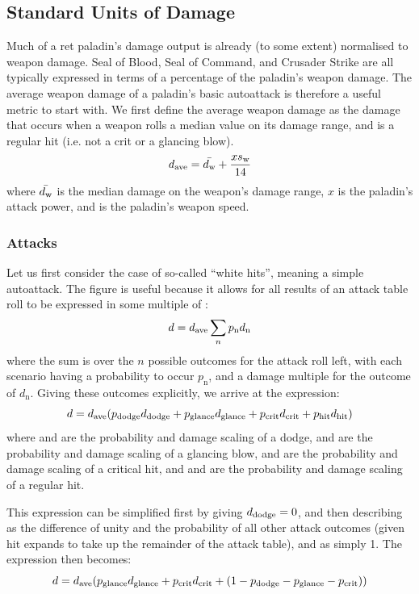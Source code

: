 \documentclass[letterpaper,11pt]{article}
\begin{document}
	\subsection{Standard Units of Damage}
	Much of a ret paladin's damage output is already (to some extent) normalised to weapon damage.	
	Seal of Blood, Seal of Command, and Crusader Strike are all typically expressed in terms of a percentage of the paladin's weapon damage.
	The average weapon damage of a paladin's basic autoattack is therefore a useful metric to start with.
	We first define the average weapon damage as the damage that occurs when a weapon rolls a median value on its damage range, and is a regular hit (i.e. not a crit or a glancing blow).
	\begin{equation}
		d_{\mathrm{ave}}  = \bar{d_\mathrm{w} } + \frac{xs_\mathrm{w} }{14}
	\end{equation}
	where $\bar{d_\mathrm{w} }$ is the median damage on the weapon's damage range, $x$ is the paladin's attack power, and \ws is the paladin's weapon speed.

	\subsubsection{Attacks}
	Let us first consider the case of so-called ``white hits'', meaning a simple autoattack.
	The \dave figure is useful because it allows for all results of an attack table roll to be expressed in some multiple of \dave:
	\begin{equation}
		d = d_{\mathrm{ave}}  \sum_n p_{\mathrm{n}} d_{\mathrm{n}}
	\end{equation}
	where the sum is over the $n$ possible outcomes for the attack roll left, with each scenario having a probability to occur $p_{\mathrm{n}}$, and a damage multiple for the outcome of $d_{\mathrm{n}}$.
	Giving these outcomes explicitly, we arrive at the expression:
	\begin{equation}
		d = d_{\mathrm{ave}}  (p_{\mathrm{dodge}}  d_{\mathrm{dodge}}  + p_{\mathrm{glance}}  d_{\mathrm{glance}}  + p_{\mathrm{crit}}  d_{\mathrm{crit}}  + p_{\mathrm{hit}}  d_{\mathrm{hit}} )
	\end{equation}
	where \pdodge and \ddodge are the probability and damage scaling of a dodge, \pglance and \dglance are the probability and damage scaling of a glancing blow, \pcrit and \dcrit are the probability and damage scaling of a critical hit, and \phit and \dhit are the probability and damage scaling of a regular hit.
	
	This expression can be simplified first by giving $d_{\mathrm{dodge}}  = 0$, and then describing \phit as the difference of unity and the probability of all other attack outcomes (given hit expands to take up the remainder of the attack table), and \dhit as simply 1. The expression then becomes:
	\begin{equation}
		d = d_{\mathrm{ave}}  (p_{\mathrm{glance}}  d_{\mathrm{glance}}  + p_{\mathrm{crit}}  d_{\mathrm{crit}}  + (1 - p_{\mathrm{dodge}}  - p_{\mathrm{glance}}  - p_{\mathrm{crit}} ))
	\end{equation}
	
\end{document}
